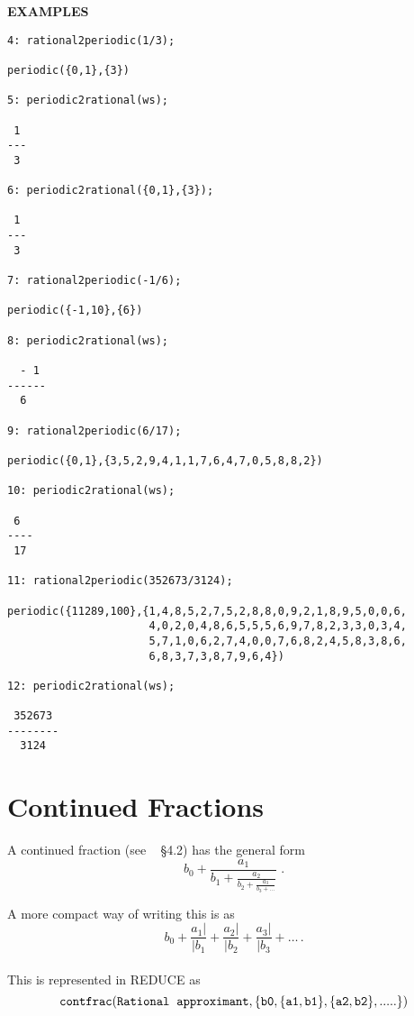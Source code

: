 {\large\bf EXAMPLES}\\
\begin{verbatim}
4: rational2periodic(1/3);

periodic({0,1},{3})

5: periodic2rational(ws);

 1
---
 3

6: periodic2rational({0,1},{3});

 1
---
 3

7: rational2periodic(-1/6);

periodic({-1,10},{6})

8: periodic2rational(ws);

  - 1
------
  6

9: rational2periodic(6/17);

periodic({0,1},{3,5,2,9,4,1,1,7,6,4,7,0,5,8,8,2})

10: periodic2rational(ws);

 6
----
 17

11: rational2periodic(352673/3124);

periodic({11289,100},{1,4,8,5,2,7,5,2,8,8,0,9,2,1,8,9,5,0,0,6,
                      4,0,2,0,4,8,6,5,5,5,6,9,7,8,2,3,3,0,3,4,
                      5,7,1,0,6,2,7,4,0,0,7,6,8,2,4,5,8,3,8,6,
                      6,8,3,7,3,8,7,9,6,4})

12: periodic2rational(ws);

 352673
--------
  3124

\end{verbatim}
\section{Continued Fractions}


A continued fraction (see ~\cite{PA} \S 4.2) has the general form
{\Large
\[b_0 + \frac{a_1}{b_1 +
         \frac{a_2}{b_2+
          \frac{a_3}{b_3 + \ldots
        }}}
\;.\]
}

A more compact way of writing this is as
\[b_0 + \frac{a_1|}{|b_1} + \frac{a_2|}{|b_2} + \frac{a_3|}{|b_3} + \ldots\,.\]
\\

This is represented in {\small REDUCE} as
\[{\tt
   contfrac({\sl Rational\hspace{2mm} approximant},
                \{b0, \{a1,b1\}, \{a2,b2\},.....\})
}\]

